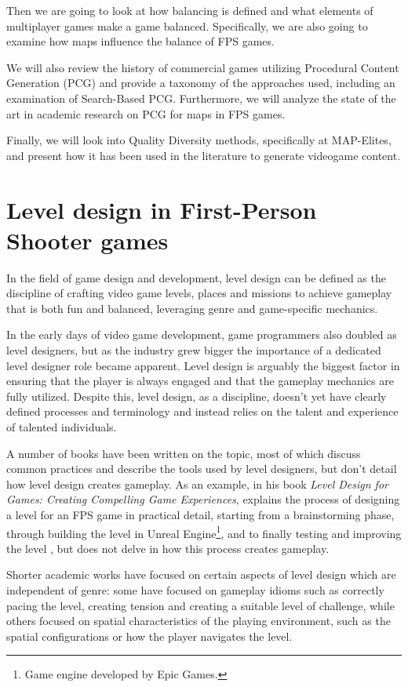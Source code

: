 \documentclass{Configuration_Files/PoliMi3i_thesis}
\begin{document}
Then we are going to look at how balancing is defined and what elements of multiplayer games make a game balanced. Specifically, we are also going to examine how maps influence the balance of FPS games.

We will also review the history of commercial games utilizing Procedural Content Generation (PCG) and provide a taxonomy of the approaches used, including an examination of Search-Based PCG. Furthermore, we will analyze the state of the art in academic research on PCG for maps in FPS games.

Finally, we will look into Quality Diversity methods, specifically at MAP-Elites, and present how it has been used in the literature to generate videogame content.

\section{Level design in First-Person Shooter games}
\label{sec:level_design}
In the field of game design and development, level design can be defined as the discipline of crafting video game levels, places and missions to achieve gameplay that is both fun and balanced, leveraging genre and game-specific mechanics.

In the early days of video game development, game programmers also doubled as level designers, but as the industry grew bigger the importance of a dedicated level designer role became apparent. Level design is arguably the biggest factor in ensuring that the player is always engaged and that the gameplay mechanics are fully utilized. Despite this, level design, as a discipline, doesn't yet have clearly defined processes and terminology and instead relies on the talent and experience of talented individuals.

A number of books have been written on the topic, most of which discuss common practices and describe the tools used by level designers, but don't detail how level design creates gameplay. As an example, in his book \textit{Level Design for Games: Creating Compelling Game Experiences},  explains the process of designing a level for an FPS game in practical detail, starting from a brainstorming phase, through building the level in Unreal Engine\footnote{Game engine developed by Epic Games.}, and to finally testing and improving the level \cite{co_level_2006}, but does not delve in how this process creates gameplay. \cite{hullett_design_2010}

Shorter academic works have focused on certain aspects of level design which are independent of genre: some have focused on gameplay idioms such as correctly pacing the level, creating tension and creating a suitable level of challenge, while others focused on spatial characteristics of the playing environment, such as the spatial configurations or how the player navigates the level. \cite{hullett_design_2010}
\end{document}
